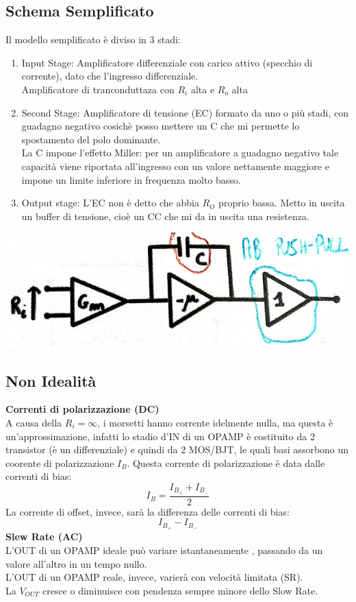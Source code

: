\documentclass{article}
\begin{document}
\subsection{Schema Semplificato}
Il modello semplificato è diviso in 3 stadi:
\begin{enumerate}
    \item Input Stage: Amplificatore differenziale con carico attivo (specchio di corrente), dato che l'ingresso differenziale.\\
    Amplificatore di tranconduttaza con $R_{i}$ alta e $R_{o}$ alta
    \item Second Stage: Amplificatore di tensione (EC) formato da uno o più stadi, con guadagno negativo cosichè posso mettere un C che mi permette lo spostamento del polo dominante.\\
    La C impone l'effetto Miller: per un amplificatore a guadagno negativo tale capacità viene riportata all’ingresso con un valore nettamente maggiore e impone un limite inferiore in frequenza molto basso.
    \item Output stage: L'EC non è detto che abbia $R_{O}$ proprio bassa. Metto in uscita un buffer di tensione, cioè un CC che mi da in uscita una resistenza.
\end{enumerate}
\vspace{0.3mm}
\begin{center}
    \includegraphics[scale=0.4]{Modello Semplificato.png}
\end{center}
\subsection{Non Idealità}
\textbf{Correnti di polarizzazione (DC)}\\
A causa della $R_{i}=\infty$, i morsetti hanno corrente idelmente nulla, ma questa è un'approssimazione, infatti lo stadio d'IN di un OPAMP è costituito da 2 transistor (è un differenziale) e quindi da 2 MOS/BJT, le quali basi assorbono un coorente di polarizzazione $I_{B}$.
Questa corrente di polarizzazione è data dalle correnti di bias:
\begin{equation}
    I_{B}=\frac{I_{B_{+}}+I_{B_{-}}}{2}
\end{equation}
La corrente di offset, invece, sarà la differenza delle correnti di bias:
\begin{equation}
    I_{B_{+}}-I_{B_{-}}
\end{equation}
\textbf{Slew Rate (AC)}\\
L'OUT di un OPAMP ideale può variare istantaneamente , passando da un valore all'altro in un tempo nullo.\\
L'OUT di un OPAMP reale, invece, varierà con velocità limitata (SR).\\
La $V_{OUT}$ cresce o diminuisce con pendenza sempre minore dello Slow Rate.
\end{document}
